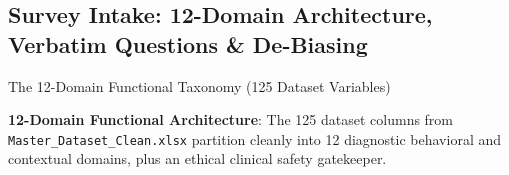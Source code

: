 \documentclass{beamer}
\begin{document}
\subsection{Survey Intake: 12-Domain Architecture, Verbatim Questions \& De-Biasing}

\begin{frame}[t]{The 12-Domain Functional Taxonomy (125 Dataset Variables)}
  \vspace{-0.20cm}
  \begin{topsummarybar}
    \fontsize{6.0pt}{7.2pt}\selectfont
    \textbf{\color{NavyDark}12-Domain Functional Architecture}: The 125 dataset columns from \texttt{Master\_Dataset\_Clean.xlsx} partition cleanly into 12 diagnostic behavioral and contextual domains, plus an ethical clinical safety gatekeeper.
  \end{topsummarybar}
  \vspace{-0.25cm}


\end{frame}
\end{document}
